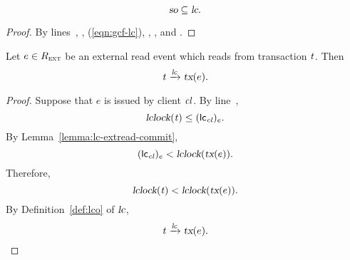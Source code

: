 \begin{applemma} \label{lemma:so-lc}
  \[
    \textsl{so} \subseteq \textsl{lc}.
  \]
\end{applemma}

\begin{proof} \label{proof:so-lc}
  By lines~\code{\ref{alg:unistore-client}}{\ref{line:commitcausaltx-lc}},
  \code{\ref{alg:unistore-client}}{\ref{line:commitstrongtx-lc-so}},
  (\ref{eqn:gcf-lc}),
  \code{\ref{alg:unistore-client}}{\ref{line:commitstrongtx-lc}},
  \code{\ref{alg:unistore-client}}{\ref{line:fence-lc}},
  and \code{\ref{alg:unistore-client}}{\ref{line:clattach-lc}}.
\end{proof}

\begin{applemma} \label{lemma:rf-lc}
  Let $e \in R_{\textsc{ext}}$ be an external read event
  which reads from transaction $\mathit{t}$. Then
  \[
    \mathit{t} \xrightarrow{\textsl{lc}} \textsl{tx}(e).
  \]
\end{applemma}

\begin{proof} \label{proof:rf-lc}
  Suppose that $e$ is issued by client $\mathit{cl}$.
  By line~\code{\ref{alg:unistore-client}}{\ref{line:read-lc}},
  \[
    \textsl{lclock}(\mathit{t}) \le ({\sf lc}_{\mathit{cl}})_{e}.
  \]
  By Lemma~\ref{lemma:lc-extread-commit},
  \[
    ({\sf lc}_{\mathit{cl}})_{e} < \textsl{lclock}(\textsl{tx}(e)).
  \]
  Therefore,
  \[
    \textsl{lclock}(\mathit{t}) < \textsl{lclock}(\textsl{tx}(e)).
  \]
  By Definition~\ref{def:lco} of $\textsl{lc}$,
  \[
    \mathit{t} \xrightarrow{\textsl{lc}} \textsl{tx}(e).
  \]
\end{proof}
